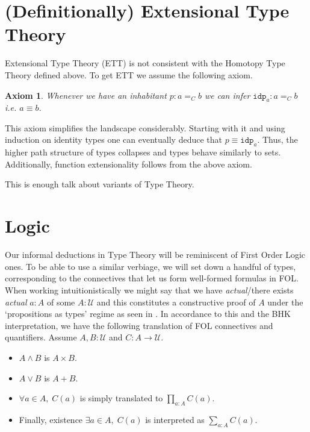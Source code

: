 \documentclass[12pt]{report}
\newtheorem{axiom}[thm]{Axiom}
\begin{document}
\section{(Definitionally) Extensional Type Theory}
Extensional Type Theory (ETT) is not consistent with the Homotopy Type Theory defined above. 
To get ETT we assume the following axiom. 
\begin{axiom}
Whenever we have an inhabitant $p : a=_C b$ we can infer $\mathtt{idp}_a : a=_C b$ i.e. $a \equiv b$. 
\end{axiom}
This axiom simplifies the landscape considerably. 
Starting with it and using induction on identity types one can eventually deduce that $p \equiv \mathtt{idp}_a$. 
Thus, the higher path structure of types collapses and types behave similarly to sets. 
Additionally, function extensionality follows from the above axiom. 

This is enough talk about variants of Type Theory.
\section{Logic}
Our informal deductions in Type Theory will be reminiscent of First Order Logic ones. 
To be able to use a similar verbiage, we will set down a handful of types, corresponding to the connectives that let us form well-formed formulas in FOL. 
When working intuitionistically we might say that we have \textit{actual}/there exists \textit{actual} $a : A$ of some $A : \mathcal{U}$ 
and this constitutes a constructive proof of $A$ under the `propositions as types' regime as seen in \cite{hottbook}. 
In accordance to this and the BHK interpretation, we have the following translation of FOL connectives and quantifiers. 
Assume $A, B : \mathcal{U}$ and $C : A \rightarrow \mathcal{U}$.
\begin{itemize}
\item $A \wedge B$ is $A \times B$.
\item $A \vee B$ is $A+ B$.
\item $\forall a\in A,\; C(a)$ is simply translated to $\prod_{a : A}C(a)$. 
\item Finally, existence $ \exists a \in A,\; C(a)$ is interpreted as $\sum_{a : A}C(a)$.
\end{itemize}
\end{document}
